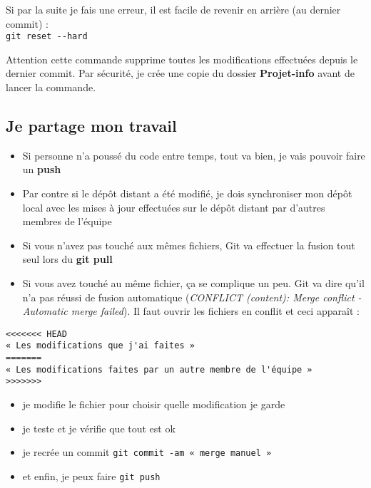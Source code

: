 \documentclass[11pt]{article}
\begin{document}
Si par la suite je fais une erreur, il est facile de revenir en arrière (au dernier commit) :\\
\verb"git reset --hard" 

\bigbreak

Attention cette commande supprime toutes les modifications effectuées depuis le dernier commit. Par sécurité, je crée une copie du dossier \textbf{Projet-info} avant de lancer la commande.



\subsection*{Je partage mon travail}

\begin{itemize}
    \item Si personne n'a poussé du code entre temps, tout va bien, je vais pouvoir faire un \textbf{push}
    \item Par contre si le dépôt distant a été modifié, je dois synchroniser mon dépôt local avec les mises à jour effectuées sur le dépôt distant par d'autres membres de l'équipe
    \item Si vous n'avez pas touché aux mêmes fichiers, Git va effectuer la fusion tout seul lors du \textbf{git pull}
    \item Si vous avez touché au même fichier, ça se complique un peu. Git va dire qu'il n'a pas réussi de fusion automatique (\textit{CONFLICT (content): Merge conflict - Automatic merge failed}). Il faut ouvrir les fichiers en conflit et ceci apparaît : 
\end{itemize}


\noindent
\verb"<<<<<<< HEAD" \\
\verb"« Les modifications que j'ai faites »" \\
\verb"=======" \\
\verb"« Les modifications faites par un autre membre de l'équipe »" \\
\verb">>>>>>>" \\

\begin{itemize}
    \item je modifie le fichier pour choisir quelle modification je garde
    \item je teste et je vérifie que tout est ok
    \item je recrée un commit \verb"git commit -am « merge manuel »"
    \item et enfin, je peux faire \verb"git push"
\end{itemize}
\end{document}
